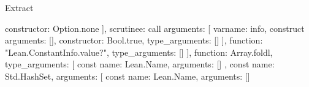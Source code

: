 \begin{lexlean}{Extract}
\begin{toolingmodule}
{{{{{{{{{{{{{{{{{{{{{{{{                                                                                  constructor: Option.none
                                                                                }
                                                                              ],
                                                                              scrutinee: call{
                                                                                arguments: [
                                                                                  var{name: info},
                                                                                  construct{
                                                                                    arguments: [],
                                                                                    constructor: Bool.true,
                                                                                    type_arguments: []
                                                                                  }
                                                                                ],
                                                                                function: "Lean.ConstantInfo.value?",
                                                                                type_arguments: []
                                                                              }
                                                                            }
                                                                          ],
                                                                          function: Array.foldl,
                                                                          type_arguments: [
                                                                            const{
                                                                              name: Lean.Name,
                                                                              arguments: []
                                                                            },
                                                                            const{
                                                                              name: Std.HashSet,
                                                                              arguments: [
                                                                                const{
                                                                                  name: Lean.Name,
                                                                                  arguments: []
}}}}}}}}}}}}}}}}}}}}}}}}
\end{toolingmodule}
\end{lexlean}
